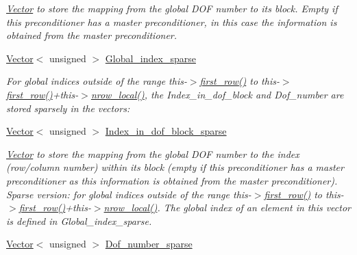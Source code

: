 \begin{DoxyCompactItemize}
\begin{DoxyCompactList}\small\item\em \hyperlink{classoomph_1_1Vector}{Vector} to store the mapping from the global D\+OF number to its block. Empty if this preconditioner has a master preconditioner, in this case the information is obtained from the master preconditioner. \end{DoxyCompactList}\item 
\hyperlink{classoomph_1_1Vector}{Vector}$<$ unsigned $>$ \hyperlink{classoomph_1_1BlockPreconditioner_ae7a8d4a769319bffc94432a3c4adf30b}{Global\+\_\+index\+\_\+sparse}
\begin{DoxyCompactList}\small\item\em For global indices outside of the range this-\/$>$\hyperlink{classoomph_1_1DistributableLinearAlgebraObject_ab00a3919b8634c698749f14a4d92947d}{first\+\_\+row()} to this-\/$>$\hyperlink{classoomph_1_1DistributableLinearAlgebraObject_ab00a3919b8634c698749f14a4d92947d}{first\+\_\+row()}+this-\/$>$\hyperlink{classoomph_1_1DistributableLinearAlgebraObject_a9bd7e1d242c69a28da85a804a7717fce}{nrow\+\_\+local()}, the Index\+\_\+in\+\_\+dof\+\_\+block and Dof\+\_\+number are stored sparsely in the vectors\+: \end{DoxyCompactList}\item 
\hyperlink{classoomph_1_1Vector}{Vector}$<$ unsigned $>$ \hyperlink{classoomph_1_1BlockPreconditioner_a06bef26c782dacdc6b5caa6419df73c9}{Index\+\_\+in\+\_\+dof\+\_\+block\+\_\+sparse}
\begin{DoxyCompactList}\small\item\em \hyperlink{classoomph_1_1Vector}{Vector} to store the mapping from the global D\+OF number to the index (row/column number) within its block (empty if this preconditioner has a master preconditioner as this information is obtained from the master preconditioner). Sparse version\+: for global indices outside of the range this-\/$>$\hyperlink{classoomph_1_1DistributableLinearAlgebraObject_ab00a3919b8634c698749f14a4d92947d}{first\+\_\+row()} to this-\/$>$\hyperlink{classoomph_1_1DistributableLinearAlgebraObject_ab00a3919b8634c698749f14a4d92947d}{first\+\_\+row()}+this-\/$>$\hyperlink{classoomph_1_1DistributableLinearAlgebraObject_a9bd7e1d242c69a28da85a804a7717fce}{nrow\+\_\+local()}. The global index of an element in this vector is defined in Global\+\_\+index\+\_\+sparse. \end{DoxyCompactList}\item 
\hyperlink{classoomph_1_1Vector}{Vector}$<$ unsigned $>$ \hyperlink{classoomph_1_1BlockPreconditioner_a5a6adc0423ef4d31562d149324c4a679}{Dof\+\_\+number\+\_\+sparse}

\end{DoxyCompactItemize}
